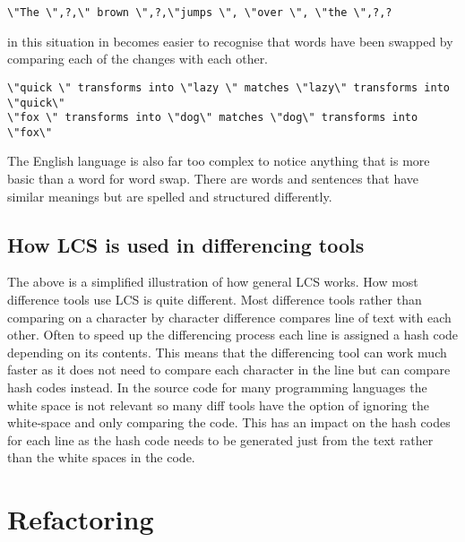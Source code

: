 \begin{verbatim}
\"The \",?,\" brown \",?,\"jumps \", \"over \", \"the \",?,?
\end{verbatim}

in this situation in becomes easier to recognise that words have been swapped by comparing each of the changes with each other.  

\begin{verbatim}
\"quick \" transforms into \"lazy \" matches \"lazy\" transforms into \"quick\"
\"fox \" transforms into \"dog\" matches \"dog\" transforms into \"fox\" 
\end{verbatim}

The English language is also far too complex to notice anything that is more basic than a word for word swap.
There are words and sentences that have similar meanings but are spelled and structured differently.

\subsection{How LCS is used in differencing tools}
The above is a simplified illustration of how general LCS works.
How most difference tools use LCS is quite different.
Most difference tools rather than comparing on a character by character difference compares line of text with each other.
Often to speed up the differencing process each line is assigned a hash code depending on its contents. 
This means that the differencing tool can work much faster as it does not need to compare each character in the line but can compare hash codes instead.
In the source code for many programming languages the white space is not relevant so many diff tools have the option of ignoring the white-space and only comparing the code.
This has an impact on the hash codes for each line as the hash code needs to be generated just from the text rather than the white spaces in the code.
% 
 
\section{Refactoring}

